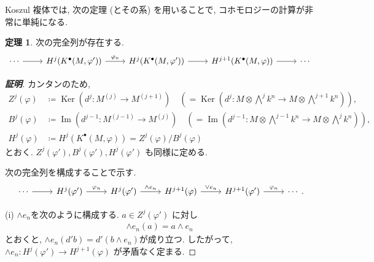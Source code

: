 \documentclass[11pt, a4paper, dvipdfmx]{jsarticle}
\theoremstyle{definition}
\newtheorem{Theorem}[Axiom]{定理}
\newcommand{\Ker}{\mathop{\mathrm{Ker}}\nolimits}
\newcommand{\Img}{\mathop{\mathrm{Im}}\nolimits}
\newcommand{\pphi}{\varphi} %
\numberwithin{equation}{section}
\begin{document}
Koszul 複体では, 次の定理 (とその系) を用いることで, 
コホモロジーの計算が非常に単純になる. 

\begin{Theorem}
    次の完全列が存在する. 
    \begin{equation}
        \begin{tikzcd}
             \cdots\arrow[left]{r}&
             H^j(K^\bullet(M,\pphi')) 
             \arrow[left]{r}{\pphi_n}&
             H^j(K^\bullet(M,\pphi'))
             \arrow[left]{r}&
             H^{j+1}(K^\bullet(M,\pphi))
             \arrow[left]{r}&\cdots
        \end{tikzcd}
    \end{equation}
\end{Theorem}

\begin{proof}[{\bf 証明}] 
    カンタンのため, 
    \begin{align*}
        Z^j(\pphi)
        &\coloneqq \Ker(d^j\colon M^{(j)}\to M^{(j+1)})
        \quad
        \left(=
            \Ker(d^j\colon
            M\otimes \bigwedge^jk^n
            \to M\otimes \bigwedge^{j+1}k^n)
        \right), \\
        B^j(\pphi)
        &\coloneqq \Img(d^{j-1}\colon M^{(j-1)}\to M^{(j)})
        \quad
        \left(=
            \Img(d^{j-1}\colon 
            M\otimes \bigwedge^{j-1}k^n
            \to M\otimes \bigwedge^{j}k^n)
        \right), \\
        H^j(\pphi)&\coloneqq H^j(K^\bullet(M,\pphi)) 
        = Z^j(\pphi)/ B^j(\pphi)
    \end{align*}
    とおく. $Z^j(\pphi'), B^j(\pphi'), H^j(\pphi')$ 
    も同様に定める. 

    次の完全列を構成することで示す. 
    \[\begin{tikzcd} 
        \cdots 
        \arrow[r]& H^j(\pphi') 
        \arrow[r,"\pphi_n"]& H^j(\pphi') 
        \arrow[r,"\wedge e_n"]& H^{j+1}(\pphi) 
        \arrow[r,"\vee e_n"]& H^{j+1}(\pphi') 
        \arrow[r,"\pphi_n"]&\cdots
    \end{tikzcd}.\]

    (i) 
    $\wedge e_n$を次のように構成する. 
    $a\in Z^j(\pphi')$ に対し 
    \begin{align*}
        \wedge e_n(a) = a\wedge e_n
    \end{align*}
    とおくと, 
    $\wedge e_n(d'b) = d'(b\wedge e_n)$が成り立つ. 
    したがって, 
    $\wedge e_n\colon H^j(\pphi') \to H^{j+1}(\pphi)$
    が矛盾なく定まる. 


\end{proof}
\end{document}

